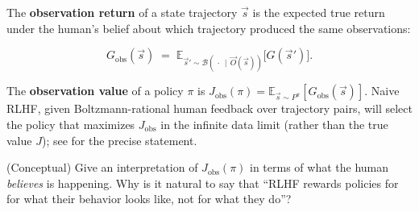 \documentclass[11pt]{article}
\newcommand{\cB}{\mathcal{B}}
\newcommand{\E}{\mathbb{E}}
\newcommand{\Gobs}{G_{\mathrm{obs}}}
\newcommand{\Jobs}{J_{\mathrm{obs}}}
\begin{document}
\begin{definition}\label{def:Gobs}
The \textbf{observation return} of a state trajectory $\vec s$ is the
expected true return under the human's belief about which trajectory
produced the same observations:
\begin{callout}
$$
\Gobs(\vec s) \;=\; \E_{\vec s' \sim \cB(\,\cdot\,\mid\, \vec O(\vec s))}\!\bigl[G(\vec s')\bigr].
$$
\end{callout}
The \textbf{observation value} of a policy $\pi$ is
$\Jobs(\pi) = \E_{\vec s \sim P^\pi}[\Gobs(\vec s)]$. Naive RLHF, given
Boltzmann-rational human feedback over trajectory pairs, will
select the policy that maximizes $\Jobs$ in the infinite data limit
(rather than the true value $J$); see \citet[Proposition 4.1]{Lang2024PORLHF}
for the precise statement.
\end{definition}


\begin{exercise}
\label{prob:Jobs_interp}
(Conceptual) Give an interpretation of $\Jobs(\pi)$ in terms of what
the human \emph{believes} is happening. Why is it natural to say
that ``RLHF rewards policies for for what their behavior looks like, not for what
they do''?
\end{exercise}
\end{document}
